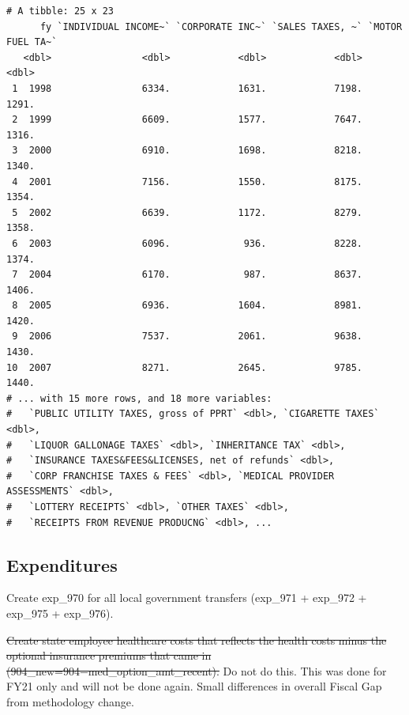 \documentclass[
  letterpaper,
  DIV=11,
  numbers=noendperiod]{scrreport}
\begin{document}
\begin{verbatim}
# A tibble: 25 x 23
      fy `INDIVIDUAL INCOME~` `CORPORATE INC~` `SALES TAXES, ~` `MOTOR FUEL TA~`
   <dbl>                <dbl>            <dbl>            <dbl>            <dbl>
 1  1998                6334.            1631.            7198.            1291.
 2  1999                6609.            1577.            7647.            1316.
 3  2000                6910.            1698.            8218.            1340.
 4  2001                7156.            1550.            8175.            1354.
 5  2002                6639.            1172.            8279.            1358.
 6  2003                6096.             936.            8228.            1374.
 7  2004                6170.             987.            8637.            1406.
 8  2005                6936.            1604.            8981.            1420.
 9  2006                7537.            2061.            9638.            1430.
10  2007                8271.            2645.            9785.            1440.
# ... with 15 more rows, and 18 more variables:
#   `PUBLIC UTILITY TAXES, gross of PPRT` <dbl>, `CIGARETTE TAXES` <dbl>,
#   `LIQUOR GALLONAGE TAXES` <dbl>, `INHERITANCE TAX` <dbl>,
#   `INSURANCE TAXES&FEES&LICENSES, net of refunds` <dbl>,
#   `CORP FRANCHISE TAXES & FEES` <dbl>, `MEDICAL PROVIDER ASSESSMENTS` <dbl>,
#   `LOTTERY RECEIPTS` <dbl>, `OTHER TAXES` <dbl>,
#   `RECEIPTS FROM REVENUE PRODUCNG` <dbl>, ...
\end{verbatim}

\hypertarget{expenditures}{%
\subsection{Expenditures}\label{expenditures}}

Create exp\_970 for all local government transfers (exp\_971 + exp\_972
+ exp\_975 + exp\_976).

\sout{Create state employee healthcare costs that reflects the health
costs minus the optional insurance premiums that came in
(904\_new=904−med\_option\_amt\_recent).} Do not do this. This was done
for FY21 only and will not be done again. Small differences in overall
Fiscal Gap from methodology change.
\end{document}
